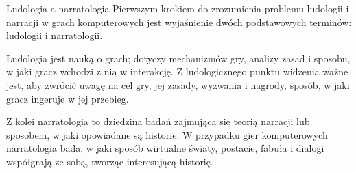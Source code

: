 \begin{frame}{Ludologia a narratologia}
Pierwszym krokiem do zrozumienia problemu ludologii i narracji w grach komputerowych jest wyjaśnienie dwóch podstawowych terminów: ludologii i narratologii.

Ludologia jest nauką o grach; dotyczy mechanizmów gry, analizy zasad i sposobu, w jaki gracz wchodzi z nią w interakcję. Z ludologicznego punktu widzenia ważne jest, aby zwrócić uwagę na cel gry, jej zasady, wyzwania i nagrody, sposób, w jaki gracz ingeruje w jej przebieg.

Z kolei narratologia to dziedzina badań zajmująca się teorią narracji lub sposobem, w jaki opowiadane są historie. W przypadku gier komputerowych narratologia bada, w jaki sposób wirtualne światy, postacie, fabuła i dialogi współgrają ze sobą, tworząc interesującą historię.
\end{frame}
